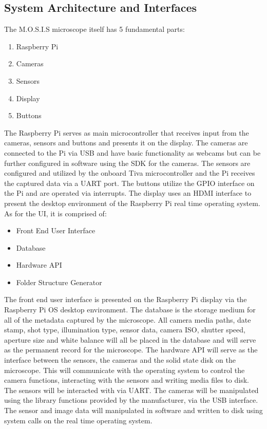 \subsection{System Architecture and Interfaces}
The M.O.S.I.S microscope itself has 5 fundamental parts:
\begin{enumerate}
	\item Raspberry Pi
	\item Cameras
	\item Sensors
	\item Display
	\item Buttons
\end{enumerate}
The Raspberry Pi serves as main microcontroller that receives input from the cameras, sensors and buttons and presents it on the display.
The cameras are connected to the Pi via USB and have basic functionality as webcams but can be further configured in software using the SDK for the cameras. The sensors are configured and utilized by the onboard Tiva microcontroller and the Pi receives the captured data via a UART port. The buttons utilize the GPIO interface on the Pi and are operated via interrupts. The display uses an HDMI interface to present the desktop environment of the Raspberry Pi real time operating system.\\
As for the UI, it is comprised of:
\begin{itemize}
	\item Front End User Interface
	\item Database
	\item Hardware API
	\item Folder Structure Generator
\end{itemize}
The front end user interface is presented on the Raspberry Pi display via the Raspberry Pi OS desktop environment. The database is the storage medium for all of the metadata captured by the microscope. All camera media paths, date stamp, shot type, illumination type, sensor data, camera ISO, shutter speed, aperture size and white balance will all be placed in the database and will serve as the permanent record for the microscope. The hardware API will serve as the interface between the sensors, the cameras and the solid state disk on the microscope. This will communicate with the operating system to control the camera functions, interacting with the sensors and writing media files to disk. The sensors will be interacted with via UART. The cameras will be manipulated using the library functions provided by the manufacturer, via the USB interface. The sensor and image data will manipulated in software and written to disk using system calls on the real time operating system.
